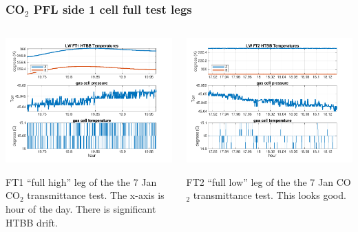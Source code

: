 \documentclass[10pt]{beamer}
\begin{document}
\begin{frame}
\frametitle{CO$_2$ PFL side 1 cell full test legs}
\begin{columns}[t]
\begin{column}{0.5\textwidth}
  \begin{centering}
  \includegraphics[width=\textwidth]{harvest_01-07/01-07_LW_FT1.png}
  \end{centering}\vspace{3mm}

  FT1 ``full high'' leg of the the 7 Jan CO$_2$ transmittance test.
  The x-axis is hour of the day.  There is significant HTBB drift.

\end{column}
\begin{column}{0.5\textwidth}  
  \begin{centering}
  \includegraphics[width=\textwidth]{harvest_01-07/01-07_LW_FT2.png}
  \end{centering}\vspace{3mm}

  FT2 ``full low'' leg of the the 7 Jan CO$_2$ transmittance test.
  This looks good.

\end{column}
\end{columns}
\end{frame}
\end{document}
